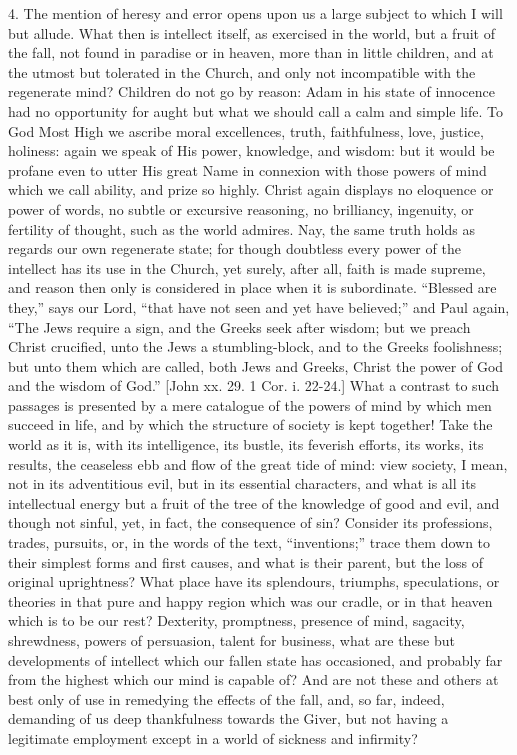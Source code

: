 4. The mention of heresy and error opens upon us a large subject to
which I will but allude. What then is intellect itself, as exercised
in the world, but a fruit of the fall, not found in paradise or in
heaven, more than in little children, and at the utmost but tolerated
in the Church, and only not incompatible with the regenerate mind?
Children do not go by reason: Adam in his state of innocence had no
opportunity for aught but what we should call a calm and simple life.
To God Most High we ascribe moral excellences, truth, faithfulness,
love, justice, holiness: again we speak of His power, knowledge, and
wisdom: but it would be profane even to utter His great Name in
connexion with those powers of mind which we call ability, and prize
so highly. Christ again displays no eloquence or power of words, no
subtle or excursive reasoning, no brilliancy, ingenuity, or fertility
of thought, such as the world admires. Nay, the same truth holds as
regards our own regenerate state; for though doubtless every power of
the intellect has its use in the Church, yet surely, after all, faith
is made supreme, and reason then only is considered in place when it
is subordinate. ``Blessed are they,'' says our Lord,
``that have not seen and yet have believed;'' and Paul again,
``The Jews require a sign, and the Greeks seek after wisdom; but
we preach Christ crucified, unto the Jews a stumbling-block, and to
the Greeks foolishness; but unto them which are called, both Jews and
Greeks, Christ the power of God and the wisdom of God.'' [John xx.
29. 1 Cor. i. 22-24.] What a contrast to such passages is presented by
a mere catalogue of the powers of mind by which men succeed in life,
and by which the structure of society is kept together! Take the world
as it is, with its intelligence, its bustle, its feverish efforts, its
works, its results, the ceaseless ebb and flow of the great tide of
mind: view society, I mean, not in its adventitious evil, but in its
essential characters, and what is all its intellectual energy but a
fruit of the tree of the knowledge of good and evil, and though not
sinful, yet, in fact, the consequence of sin? Consider its
professions, trades, pursuits, or, in the words of the text,
``inventions;'' trace them down to their simplest forms and
first causes, and what is their parent, but the loss of original
uprightness? What place have its splendours, triumphs, speculations,
or theories in that pure and happy region which was our cradle, or in
that heaven which is to be our rest? Dexterity, promptness, presence
of mind, sagacity, shrewdness, powers of persuasion, talent for
business, what are these but developments of intellect which our
fallen state has occasioned, and probably far from the highest which
our mind is capable of? And are not these and others at best only of
use in remedying the effects of the fall, and, so far, indeed,
demanding of us deep thankfulness towards the Giver, but not having a
legitimate employment except in a world of sickness and infirmity?

